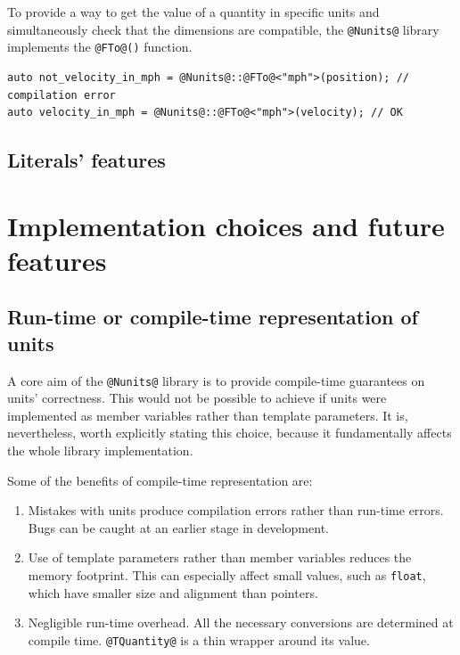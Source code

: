 \documentclass[11pt,letterpaper]{article}
\makeatletter
\newcommand{\lib}{\lstinline{@Nunits@} library}
\makeatother
\begin{document}
To provide a way to get the value of a quantity in specific units and simultaneously check
that the dimensions are compatible, the \lib{} implements the
\lstinline{@FTo@()} function.
%
\begin{lstlisting}
auto not_velocity_in_mph = @Nunits@::@FTo@<"mph">(position); // compilation error
auto velocity_in_mph = @Nunits@::@FTo@<"mph">(velocity); // OK
\end{lstlisting}

\subsection{Literals' features} %

\section{Implementation choices and future features}\label{sec:choices} %

\subsection{Run-time or compile-time representation of units} %

A core aim of the \lib{} is to provide compile-time guarantees on units' correctness.
This would not be possible to achieve if units were implemented as member variables rather
than template parameters.
It is, nevertheless, worth explicitly stating this choice, because it fundamentally affects
the whole library implementation.

Some of the benefits of compile-time representation are:
\begin{enumerate}
    \item Mistakes with units produce compilation errors rather than run-time errors.
        Bugs can be caught at an earlier stage in development.
    \item Use of template parameters rather than member variables reduces the memory footprint.
        This can especially affect small values, such as \lstinline{float}, which have smaller
        size and alignment than pointers.
    \item Negligible run-time overhead.
        All the necessary conversions are determined at compile time.
        \lstinline{@TQuantity@} is a thin wrapper around its value.
\end{enumerate}
\end{document}

